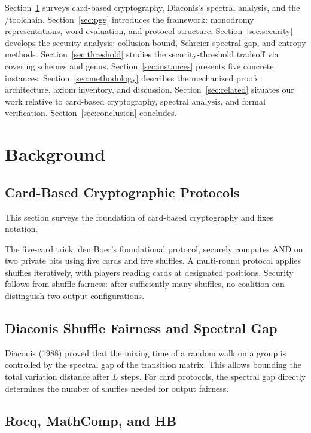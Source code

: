 \documentclass[11pt,a4paper]{article}
\begin{document}
Section~\ref{sec:background} surveys card-based cryptography, Diaconis's spectral analysis, and the \Rocq/\MathComp toolchain.
Section~\ref{sec:pgg} introduces the \pgg framework: monodromy representations, word evaluation, and protocol structure.
Section~\ref{sec:security} develops the security analysis: collusion bound, Schreier spectral gap, and entropy methods.
Section~\ref{sec:threshold} studies the security-threshold tradeoff via covering schemes and genus.
Section~\ref{sec:instances} presents five concrete instances.
Section~\ref{sec:methodology} describes the mechanized proofs: architecture, axiom inventory, and discussion.
Section~\ref{sec:related} situates our work relative to card-based cryptography, spectral analysis, and formal verification.
Section~\ref{sec:conclusion} concludes.

\section{Background}
\label{sec:background}

\subsection{Card-Based Cryptographic Protocols}
\label{sec:bg-cards}

This section surveys the foundation of card-based cryptography and fixes notation.

The five-card trick, den Boer's foundational protocol, securely computes AND on two private bits using five cards and five shuffles.
A multi-round protocol applies shuffles iteratively, with players reading cards at designated positions.
Security follows from shuffle fairness: after sufficiently many shuffles, no coalition can distinguish two output configurations.

\subsection{Diaconis Shuffle Fairness and Spectral Gap}
\label{sec:bg-diaconis}

Diaconis (1988) proved that the mixing time of a random walk on a group is controlled by the spectral gap of the transition matrix.
This allows bounding the total variation distance after $L$ steps.
For card protocols, the spectral gap directly determines the number of shuffles needed for output fairness.

\subsection{Rocq, MathComp, and HB}
\label{sec:bg-rocq}
\end{document}
